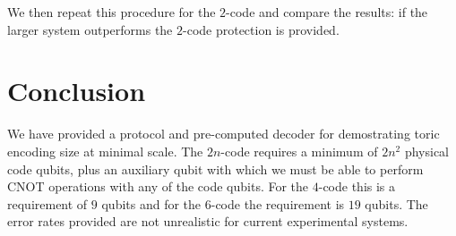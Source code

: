 We then repeat this procedure for the $2$-code and compare the results: if the larger system outperforms the $2$-code protection is provided. 


\section{Conclusion}

We have provided a protocol and pre-computed decoder for demostrating toric encoding size at minimal scale. The $2n$-code requires a minimum of $2n^2$ physical code qubits, plus an auxiliary qubit with which we must be able to perform CNOT operations with any of the code qubits. For the $4$-code this is a requirement of $9$ qubits and for the $6$-code the requirement is $19$ qubits. The error rates provided are not unrealistic for current experimental systems. 


